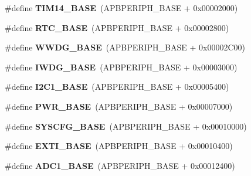 \begin{DoxyCompactItemize}
\#define {\bfseries T\+I\+M14\+\_\+\+B\+A\+SE}~(A\+P\+B\+P\+E\+R\+I\+P\+H\+\_\+\+B\+A\+SE + 0x00002000)
\item 
\mbox{\label{group___peripheral__memory__map_ga4265e665d56225412e57a61d87417022}} 
\#define {\bfseries R\+T\+C\+\_\+\+B\+A\+SE}~(A\+P\+B\+P\+E\+R\+I\+P\+H\+\_\+\+B\+A\+SE + 0x00002800)
\item 
\mbox{\label{group___peripheral__memory__map_ga9a5bf4728ab93dea5b569f5b972cbe62}} 
\#define {\bfseries W\+W\+D\+G\+\_\+\+B\+A\+SE}~(A\+P\+B\+P\+E\+R\+I\+P\+H\+\_\+\+B\+A\+SE + 0x00002\+C00)
\item 
\mbox{\label{group___peripheral__memory__map_ga8543ee4997296af5536b007cd4748f55}} 
\#define {\bfseries I\+W\+D\+G\+\_\+\+B\+A\+SE}~(A\+P\+B\+P\+E\+R\+I\+P\+H\+\_\+\+B\+A\+SE + 0x00003000)
\item 
\mbox{\label{group___peripheral__memory__map_gacd72dbffb1738ca87c838545c4eb85a3}} 
\#define {\bfseries I2\+C1\+\_\+\+B\+A\+SE}~(A\+P\+B\+P\+E\+R\+I\+P\+H\+\_\+\+B\+A\+SE + 0x00005400)
\item 
\mbox{\label{group___peripheral__memory__map_gac691ec23dace8b7a649a25acb110217a}} 
\#define {\bfseries P\+W\+R\+\_\+\+B\+A\+SE}~(A\+P\+B\+P\+E\+R\+I\+P\+H\+\_\+\+B\+A\+SE + 0x00007000)
\item 
\mbox{\label{group___peripheral__memory__map_ga62246020bf3b34b6a4d8d0e84ec79d3d}} 
\#define {\bfseries S\+Y\+S\+C\+F\+G\+\_\+\+B\+A\+SE}~(A\+P\+B\+P\+E\+R\+I\+P\+H\+\_\+\+B\+A\+SE + 0x00010000)
\item 
\mbox{\label{group___peripheral__memory__map_ga87371508b3bcdcd98cd1ec629be29061}} 
\#define {\bfseries E\+X\+T\+I\+\_\+\+B\+A\+SE}~(A\+P\+B\+P\+E\+R\+I\+P\+H\+\_\+\+B\+A\+SE + 0x00010400)
\item 
\mbox{\label{group___peripheral__memory__map_ga695c9a2f892363a1c942405c8d351b91}} 
\#define {\bfseries A\+D\+C1\+\_\+\+B\+A\+SE}~(A\+P\+B\+P\+E\+R\+I\+P\+H\+\_\+\+B\+A\+SE + 0x00012400)

\end{DoxyCompactItemize}
